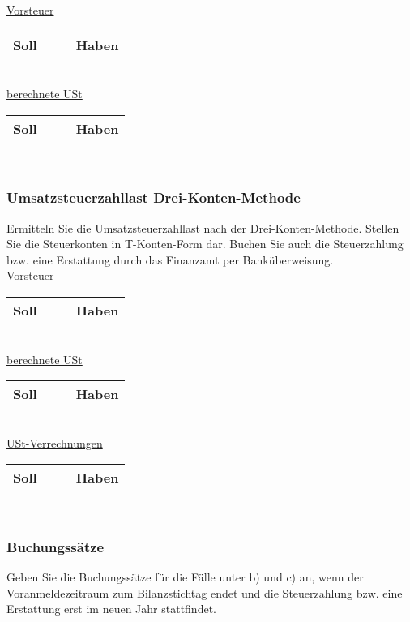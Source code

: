 \documentclass[paper=a4, fontsize=11pt]{scrartcl}
\numberwithin{equation}{section}
\numberwithin{figure}{section}
\numberwithin{table}{section}
\begin{document}
{\underline{Vorsteuer}

\begin{tabular}{cc|cc}
\hline
Soll & & & Haben \\
\hline
\end{tabular}
\\

\underline{berechnete USt}

\begin{tabular}{cc|cc}
\hline
Soll & & & Haben \\
\hline
\end{tabular}
\\

\subsubsection{Umsatzsteuerzahllast Drei-Konten-Methode}
Ermitteln Sie die Umsatzsteuerzahllast nach der Drei-Konten-Methode. Stellen Sie die Steuerkonten in T-Konten-Form dar. Buchen Sie auch die Steuerzahlung bzw. eine Erstattung durch das Finanzamt per Banküberweisung. \\

\underline{Vorsteuer}

\begin{tabular}{cc|cc}
\hline
Soll & & & Haben \\
\hline
\end{tabular}
\\

\underline{berechnete USt}

\begin{tabular}{cc|cc}
\hline
Soll & & & Haben \\
\hline
\end{tabular}
\\

\underline{USt-Verrechnungen}

\begin{tabular}{cc|cc}
\hline
Soll & & & Haben \\
\hline
\end{tabular}
\\

\subsubsection{Buchungssätze}
Geben Sie die Buchungssätze für die Fälle unter b) und c) an, wenn der Voranmeldezeitraum zum Bilanzstichtag endet und die Steuerzahlung bzw. eine Erstattung erst im neuen Jahr stattfindet.

}
\end{document}
